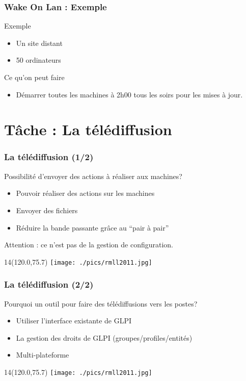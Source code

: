 \documentclass{beamer}
\newcommand{\WorkInProgress}{%
\begin{textblock}{14}(120.0,75.7)
\texttt{[image: ./pics/rmll2011.jpg]}
\end{textblock}
  }
\begin{document}
\begin{frame}
    \frametitle{Wake On Lan : Exemple}

    \begin{block}{Exemple}
    \begin{itemize}
    \item Un site distant
    \item 50 ordinateurs
    \end{itemize}
    \end{block}


    \begin{block}{Ce qu'on peut faire}
    \begin{itemize}
    \item Démarrer toutes les machines à 2h00 tous les soirs pour les mises à jour.
    \end{itemize}
    \end{block}

\end{frame}


\section{Tâche : La télédiffusion}

\begin{frame}
    \frametitle{La télédiffusion (1/2)}

    \begin{block}{Possibilité d'envoyer des actions à réaliser aux machines?}
    \begin{itemize}
        \item Pouvoir réaliser des actions sur les machines
        \item Envoyer des fichiers
        \item Réduire la bande passante grâce au “pair à pair”
    \end{itemize}
    Attention : ce n'est pas de la gestion de configuration.
    \end{block}

\WorkInProgress
\end{frame}

\begin{frame}
    \frametitle{La télédiffusion (2/2)}

    \begin{block}{Pourquoi un outil pour faire des télédiffusions vers les postes?}
    \begin{itemize}
        \item Utiliser l'interface existante de GLPI
        \item La gestion des droits de GLPI (groupes/profiles/entités)
        \item Multi-plateforme
    \end{itemize}
    \end{block}

\WorkInProgress
\end{frame}
\end{document}
